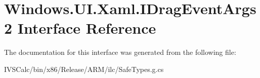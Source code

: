 \hypertarget{interface_windows_1_1_u_i_1_1_xaml_1_1_i_drag_event_args2}{}\section{Windows.\+U\+I.\+Xaml.\+I\+Drag\+Event\+Args2 Interface Reference}
\label{interface_windows_1_1_u_i_1_1_xaml_1_1_i_drag_event_args2}


The documentation for this interface was generated from the following file\+:\begin{DoxyCompactItemize}
\item 
I\+V\+S\+Calc/bin/x86/\+Release/\+A\+R\+M/ilc/Safe\+Types.\+g.\+cs\end{DoxyCompactItemize}
